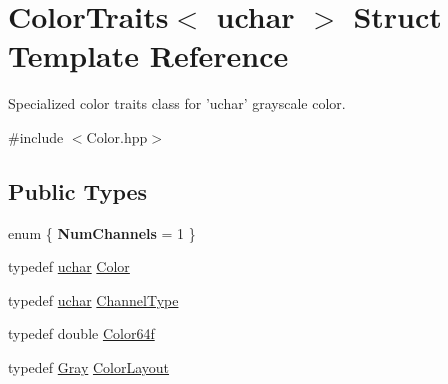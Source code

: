 \hypertarget{struct_d_o_1_1_color_traits_3_01uchar_01_4}{\section{Color\-Traits$<$ uchar $>$ Struct Template Reference}
\label{struct_d_o_1_1_color_traits_3_01uchar_01_4}
}


Specialized color traits class for 'uchar' grayscale color.  




{\ttfamily \#include $<$Color.\-hpp$>$}

\subsection*{Public Types}
\begin{DoxyCompactItemize}
\item 
enum \{ {\bfseries Num\-Channels} = 1
 \}
\item 
typedef \hyperlink{group___eigen_typedefs_ga65f85814a8290f9797005d3b28e7e5fc}{uchar} \hyperlink{struct_d_o_1_1_color_traits_3_01uchar_01_4_a6a6b36f9ac287bde85a4a9a4a0cd4430}{Color}
\item 
typedef \hyperlink{group___eigen_typedefs_ga65f85814a8290f9797005d3b28e7e5fc}{uchar} \hyperlink{struct_d_o_1_1_color_traits_3_01uchar_01_4_aea02f057eaa34dbc5eddf2ff26572206}{Channel\-Type}
\item 
typedef double \hyperlink{struct_d_o_1_1_color_traits_3_01uchar_01_4_a9a301fd8ba0a7225e38351d3e5b2e4d3}{Color64f}
\item 
typedef \hyperlink{struct_d_o_1_1_gray}{Gray} \hyperlink{struct_d_o_1_1_color_traits_3_01uchar_01_4_a7c9d599cfa0d1404784fbe60e6bcfd24}{Color\-Layout}
\end{DoxyCompactItemize}
